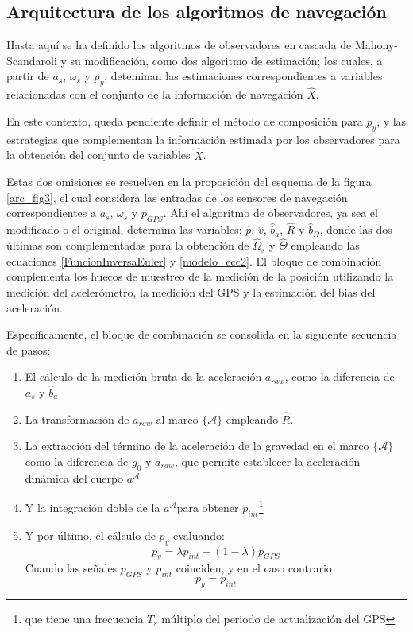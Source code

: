 \documentclass[10pt]{report}
\numberwithin{equation}{chapter}
\numberwithin{algorithm}{chapter}
\newcommand{\marco}[1]{\{\mathcal{#1}\}}
\begin{document}
\subsection{Arquitectura de los algoritmos de navegación}
Hasta aquí se ha definido los algoritmos de observadores en cascada de Mahony-Scandaroli y su modificación, como dos algoritmo de estimación; los cuales, a partir de $a_s$, $\omega_s$ y $p_y$, deteminan las estimaciones correspondientes a variables relacionadas con el conjunto de la información de navegación $\hat{X}$.\par
En este contexto, queda pendiente definir el método de composición para $p_y$, y las estrategias que complementan la información estimada por los observadores para la obtención del conjunto de variables $\hat{X}$.\par
Estas dos omisiones se resuelven en la proposición del esquema de la figura \ref{arc_fig3}, el cual considera las entradas de los sensores de navegación correspondientes a $a_s$, $\omega_s$ y $p_{GPS}$. Ahí el algoritmo de observadores, ya sea el modificado o el original, determina las variables: $\hat{p}$, $\hat{v}$, $\hat{b}_a$, $\hat{R}$ y $\hat{b}_\Omega$, donde las dos últimas son complementadas para la obtención de $\hat{\Omega}_s$ y $\hat{\Theta}$ empleando las ecuaciones \ref{FuncionInversaEuler} y \ref{modelo_ecc2}. El bloque de combinación complementa los huecos de muestreo de la medición de la posición utilizando la medición del acelerómetro, la medición del GPS y la estimación del bias del aceleración.\par
Específicamente, el bloque de combinación se consolida en la siguiente secuencia de pasos:
\begin{enumerate} 
\item El cálculo de la medición bruta de la aceleración $a_{raw}$, como la diferencia de $a_s$ y $\hat{b}_a$
\item La transformación de $a_{raw}$ al marco $\marco{A}$ empleando $\hat{R}$.
\item La extracción del término de la aceleración de la gravedad en el marco $\marco{A}$ como la diferencia de $g_0$ y $a_{raw}$, que permite establecer la aceleración dinámica del cuerpo $a^{\mathcal{A}}$
\item Y la integración doble de la $a^{\mathcal{A}}$para obtener $p_{int}$\footnote{ que tiene una frecuencia $T_s$ múltiplo del periodo de actualización del GPS}
\item Y por último, el cálculo de $p_y$ evaluando:
\begin{equation}\label{arq_ecc1}
p_y=\lambda p_{int}+(1-\lambda)p_{GPS}
\end{equation}
Cuando las señales $p_{GPS}$ y $p_{int}$ coinciden, y en el caso contrario \begin{equation}p_y=p_{int}\end{equation}
\end{enumerate}
\end{document}
